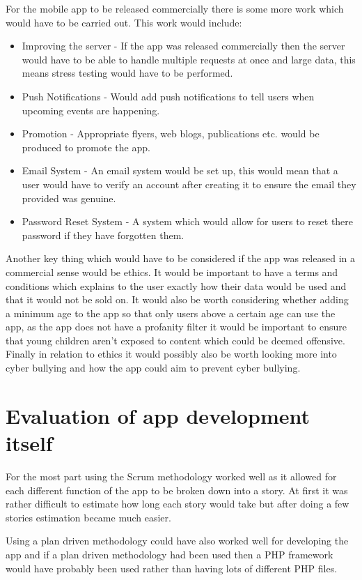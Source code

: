 For the mobile app to be released commercially there is some more work which would have to be carried out. This work would include:
\begin{itemize}
\item Improving the server - If the app was released commercially then the server would have to be able to handle multiple requests at once and large data, this means stress testing would have to be performed.
\item Push Notifications - Would add push notifications to tell users when upcoming events are happening.
\item Promotion - Appropriate flyers, web blogs, publications etc. would be produced to promote the app.
\item Email System - An email system would be set up, this would mean that a user would have to verify an account after creating it to ensure the email they provided was genuine.
\item Password Reset System - A system which would allow for users to reset there password if they have forgotten them.
\end{itemize} 
Another key thing which would have to be considered if the app was released in a commercial sense would be ethics. It would be important to have a terms and conditions which explains to the user exactly how their data would be used and that it would not be sold on. It would also be worth considering whether adding a minimum age to the app so that only users above a certain age can use the app, as the app does not have a profanity filter it would be important to ensure that young children aren't exposed to content which could be deemed offensive. Finally in relation to ethics it would possibly also be worth looking more into cyber bullying and how the app could aim to prevent cyber bullying.

\section{Evaluation of app development itself}
For the most part using the Scrum methodology worked well as it allowed for each different function of the app to be broken down into a story. At first it was rather difficult to estimate how long each story would take but after doing a few stories estimation became much easier.

Using a plan driven methodology could have also worked well for developing the app and if a plan driven methodology had been used then a PHP framework would have probably been used rather than having lots of different PHP files. 

